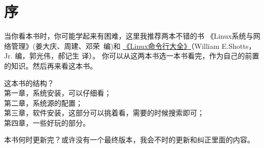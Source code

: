 \chapter{序}

当你看本书时，你可能学起来有困难，这里我推荐两本不错的书 《Linux系统与网络管理》(姜大庆、周建、邓荣~编)和 
\href{https://item.jd.com/11196146.html}{《Linux命令行大全》}（William E.Shotts，Jr. 编，郭光伟，郝记生 译）。
你可以从这两本书选一本书看完，作为自己的前置的知识。然后再来看这本书。


这本书的结构？\\
第一章，系统安装，可以仔细看；\\
第二章，系统源的配置；\\
第三章，软件安装，这部分可以挑着看，需要的时候搜索即可；\\
第四章，一些好玩的部分。

本书何时更新完？或许没有一个最终版本，我会不时的更新和纠正里面的内容。